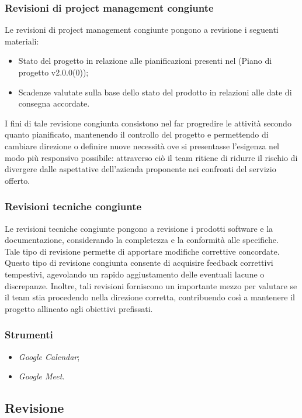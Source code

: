 \documentclass[10pt, a4paper]{article}
\begin{document}
\subsubsection{Revisioni di project management congiunte}
Le revisioni di project management congiunte pongono a revisione i seguenti materiali:
\begin{itemize}
    \item Stato del progetto in relazione alle pianificazioni presenti nel (Piano di progetto v2.0.0(0));
    \item Scadenze valutate sulla base dello stato del prodotto in relazioni alle date di consegna accordate.
\end{itemize}
I fini di tale revisione congiunta consistono nel far progredire le attività secondo quanto pianificato, mantenendo il controllo del progetto e 
permettendo di cambiare direzione o definire nuove necessità ove si presentasse l'esigenza nel modo più responsivo possibile: attraverso ciò il team
ritiene di ridurre il rischio di divergere dalle aspettative dell'azienda proponente nei confronti del servizio offerto.

\subsubsection{Revisioni tecniche congiunte}
Le revisioni tecniche congiunte pongono a revisione i prodotti software e la documentazione, considerando la completezza e la conformità alle specifiche.\\
Tale tipo di revisione permette di apportare modifiche correttive concordate. Questo tipo di revisione congiunta consente di acquisire feedback 
correttivi tempestivi, agevolando un rapido aggiustamento delle eventuali lacune o discrepanze. Inoltre, tali revisioni forniscono un importante 
mezzo per valutare se il team stia procedendo nella direzione corretta, contribuendo così a mantenere il progetto allineato agli obiettivi 
prefissati.

\subsubsection{Strumenti}
\begin{itemize}
    \item \textit{Google Calendar};
    \item \textit{Google Meet}.
\end{itemize}

\subsection{Revisione}
\end{document}
